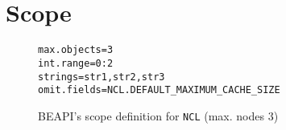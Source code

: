 \\
\\
   



\section{Scope}
\label{sec:scope}

\begin{figure}[t!]
\begin{lstlisting}[keywordstyle=\scriptsize\ttfamily]
max.objects=3
int.range=0:2
strings=str1,str2,str3
omit.fields=NCL.DEFAULT_MAXIMUM_CACHE_SIZE
\end{lstlisting}
\caption{\textsf{BEAPI}'s scope definition for \texttt{NCL} (max. nodes 3)}
\label{fig:NCL-fin-BEAPI}
\end{figure}

